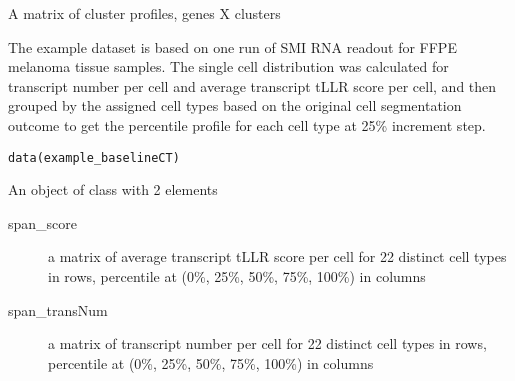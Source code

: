 \documentclass[letterpaper]{book}
\begin{document}
%
\begin{Value}
A matrix of cluster profiles, genes X clusters
\end{Value}
%
\begin{Description}
The example dataset is based on one run of SMI RNA readout for FFPE melanoma tissue samples. The single cell distribution was calculated for transcript number per cell and average transcript tLLR score per cell, and then grouped by the assigned cell types based on the original cell segmentation outcome to get the percentile profile for each cell type at 25\% increment step.
\end{Description}
%
\begin{Usage}
\begin{verbatim}
data(example_baselineCT)
\end{verbatim}
\end{Usage}
%
\begin{Format}
An object of class  with 2 elements
\begin{description}

\item[span\_score] a matrix of average transcript tLLR score per cell for 22 distinct cell types in rows, percentile at (0\%, 25\%, 50\%, 75\%, 100\%) in columns
\item[span\_transNum] a matrix of transcript number per cell for 22 distinct cell types in rows, percentile at (0\%, 25\%, 50\%, 75\%, 100\%) in columns

\end{description}

\end{Format}
%
\end{document}

